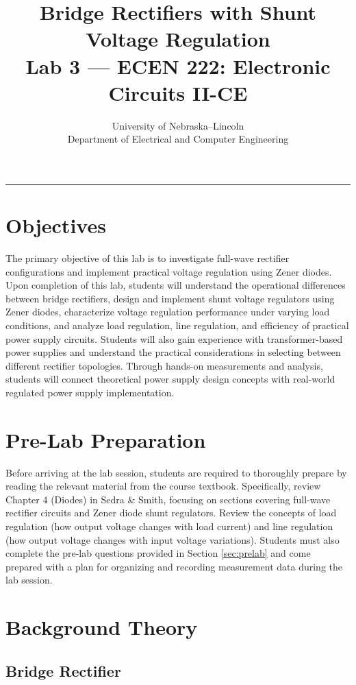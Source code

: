 \documentclass[10pt]{article}
\title{\textbf{\Huge Bridge Rectifiers with Shunt Voltage Regulation}\\
\large Lab 3 — ECEN 222: Electronic Circuits II-CE}
\author{
\large University of Nebraska–Lincoln\\
\large Department of Electrical and Computer Engineering\\
}
\date{}
\begin{document}
\thispagestyle{fancy}
\maketitle
\rule{\textwidth}{0.5pt}

\section{Objectives}

The primary objective of this lab is to investigate full-wave rectifier configurations and implement practical voltage regulation using Zener diodes. Upon completion of this lab, students will understand the operational differences between bridge rectifiers, design and implement shunt voltage regulators using Zener diodes, characterize voltage regulation performance under varying load conditions, and analyze load regulation, line regulation, and efficiency of practical power supply circuits.  Students will also gain experience with transformer-based power supplies and understand the practical considerations in selecting between different rectifier topologies.  Through hands-on measurements and analysis, students will connect theoretical power supply design concepts with real-world regulated power supply implementation.

\section{Pre-Lab Preparation}

Before arriving at the lab session, students are required to thoroughly prepare by reading the relevant material from the course textbook.  Specifically, review Chapter 4 (Diodes) in Sedra \& Smith, focusing on sections covering full-wave rectifier circuits and Zener diode shunt regulators. Review the concepts of load regulation (how output voltage changes with load current) and line regulation (how output voltage changes with input voltage variations). Students must also complete the pre-lab questions provided in Section \ref{sec:prelab} and come prepared with a plan for organizing and recording measurement data during the lab session. 

\section{Background Theory}

\subsection{Bridge Rectifier}
\end{document}

